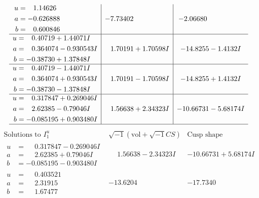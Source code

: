 \documentclass[1p]{elsarticle_modified}
\theoremstyle{definition}
\newcommand{\I}{\sqrt{-1}}
\begin{document}
$$\begin{array}{c|c|c}
\begin{aligned}
u &= \phantom{-}1.14626\phantom{ +0.000000I} \\
a &= -0.626888\phantom{ +0.000000I} \\
b &= \phantom{-}0.600846\phantom{ +0.000000I}\end{aligned}
 & -7.73402\phantom{ +0.000000I} & -2.06680\phantom{ +0.000000I} \\ \hline\begin{aligned}
u &= \phantom{-}0.40719 + 1.44071 I \\
a &= \phantom{-}0.364074 - 0.930543 I \\
b &= -0.38730 + 1.37848 I\end{aligned}
 & \phantom{-}1.70191 + 1.70598 I & -14.8255 - 1.4132 I \\ \hline\begin{aligned}
u &= \phantom{-}0.40719 - 1.44071 I \\
a &= \phantom{-}0.364074 + 0.930543 I \\
b &= -0.38730 - 1.37848 I\end{aligned}
 & \phantom{-}1.70191 - 1.70598 I & -14.8255 + 1.4132 I \\ \hline\begin{aligned}
u &= \phantom{-}0.317847 + 0.269046 I \\
a &= \phantom{-}2.62385 - 0.79046 I \\
b &= -0.085195 + 0.903480 I\end{aligned}
 & \phantom{-}1.56638 + 2.34323 I & -10.66731 - 5.68174 I\\
 \hline 
 \end{array}$$\newpage$$\begin{array}{c|c|c}  
\text{Solutions to }I^u_{1}& \I (\text{vol} + \sqrt{-1}CS) & \text{Cusp shape}\\
 \hline 
\begin{aligned}
u &= \phantom{-}0.317847 - 0.269046 I \\
a &= \phantom{-}2.62385 + 0.79046 I \\
b &= -0.085195 - 0.903480 I\end{aligned}
 & \phantom{-}1.56638 - 2.34323 I & -10.66731 + 5.68174 I \\ \hline\begin{aligned}
u &= \phantom{-}0.403521\phantom{ +0.000000I} \\
a &= \phantom{-}2.31915\phantom{ +0.000000I} \\
b &= \phantom{-}1.67477\phantom{ +0.000000I}\end{aligned}
 & -13.6204\phantom{ +0.000000I} & -17.7340\phantom{ +0.000000I} \\ \hline\begin{aligned}

\end{aligned}
\end{array}$$
\end{document}
